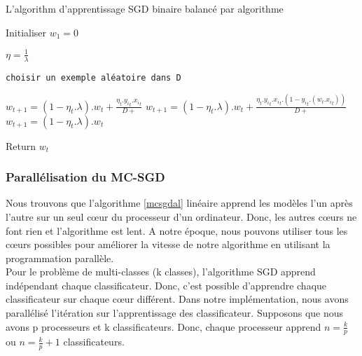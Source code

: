 \begin{algorithm}[H]
\caption{L'algorithm d'apprentissage SGD binaire balancé par algorithme}\label{balance-sgdal}
\begin{algorithmic}[1]

\State Initialiser $w_1 = 0$


\State $\eta = \frac{1}{\lambda}$

\State \texttt{choisir un exemple aléatoire dans D}

\State $w_{t+1} = (1 - \eta_t.\lambda).w_t + \frac{\eta_t.{y_i}_t.{x_i}_t}{D+}$
\State $w_{t+1} = (1 - \eta_t.\lambda).w_t + \frac{\eta_t.{y_i}_t.{x_i}_t.(1 - {y_i}_t.(w_t.{x_i}_t))}{D+}$
\Else
\State $w_{t+1} = (1 - \eta_t.\lambda).w_t$
\EndIf
\EndFor

\EndFor

\State Return $w_{t}$

\EndProcedure
\end{algorithmic}
\end{algorithm}


\subsubsection{Parallélisation du MC-SGD}
Nous trouvons que l'algorithme \ref{mcsgdal} linéaire apprend les modèles l'un après l'autre sur un seul cœur du processeur d'un ordinateur. Donc, les autres cœurs ne font rien et l'algorithme est lent. A notre époque, nous pouvons utiliser tous les cœurs possibles pour améliorer la vitesse de notre algorithme en utilisant la programmation parallèle.\\

Pour le problème de multi-classes (k classes), l'algorithme SGD apprend indépendant chaque classificateur. Donc, c'est possible d'apprendre chaque classificateur sur chaque cœur différent. Dans notre implémentation, nous avons parallélisé l'itération sur l'apprentissage des classificateur. Supposons que nous avons p processeurs et k classificateurs. Donc, chaque processeur apprend $n = \frac{k}{p}$ ou $n = \frac{k}{p} + 1$ classificateurs.

